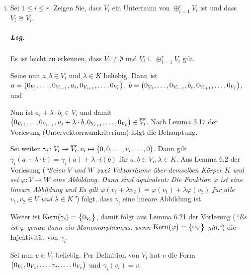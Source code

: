 \documentclass{scrreprt}
\newcommand\Kern{\text{Kern}}
\begin{document}
\begin{enumerate}[(i)]
\item Sei $1 \leq i \leq r$.
  Zeigen Sie, dass $\overline{V_i}$ ein Unterraum von $\oplus_{i = 1}^r V_i$ ist
  und dass $V_i \cong \overline{V_i}$.

  \subparagraph{Lsg.} Es ist leicht zu erkennen, dass
  $\overline{V_i} \ne \emptyset$ und
  $\overline{V_i} \subseteq \oplus_{i = 1}^r V_i$ gilt.

  Seine nun $a, b \in \overline{V_i}$ und $\lambda \in K$ beliebig.
  Dann ist
  $a = \qty\big(
    0_{V_1}, \ldots, 0_{V_{i - 1}}, a_i, 0_{V_{i + 1}}, \ldots, 0_{V_r}
  )$,
  $b = \qty\big(
    0_{V_1}, \ldots, 0_{V_{i - 1}}, b_i, 0_{V_{i + 1}}, \ldots, 0_{V_r}
  )$,
  und
  Nun ist $a_i + \lambda \cdot b_i \in V_i$ und damit
  $\qty\big(
    0_{V_1},
    \ldots,
    0_{V_{i - 1}},
    a_i + \lambda \cdot b,
    0_{V_{i + 1}},
    \ldots,
    0_{V_r}
  ) \in \overline{V_i}$.
  Nach Lemma 3.17 der Vorlesung (Untervektorraumkriterium) folgt die Behauptung.

  Sei weiter
  $\gamma_i \colon V_i \to \overline{V_i},
  v_i \mapsto \qty\big(0, 0, \ldots, v_i, \ldots, 0)$.
  Dann gilt $\gamma_i(a + \lambda \cdot b) = \gamma_i(a) + \lambda \cdot i(b)$
  für $a, b \in V_i, \lambda \in K$.
  Aus Lemma 6.2 der Vorlesung (\emph{``Seien $V$ und $W$ zwei Vektorräume über
    demselben Körper $K$ und sei $\varphi \colon V \to W$ eine Abbildung.
    Dann sind äquivalent: Die Funktion $\varphi$ ist eine lineare Abbildung und
    Es gilt $\varphi(v_1 + \lambda v_2) = \varphi(v_1) + \lambda\varphi(v_2)$
    für alle $v_1, v_2 \in V$ und $\lambda \in K$''})
  folgt, dass $\gamma_i$ eine lineare Abbildung ist.

  Weiter ist $\Kern(\gamma_i) = \qty\big{0_{V_i}}$, damit folgt aus Lemma 6.21 der
  Vorlesung (\emph{``Es ist $\varphi$ genau dann ein Monomorphismus. wenn
    $\Kern\qty\big(\varphi) = \qty\big{0_V}$ gilt.''}) die Injektivität von
  $\gamma_i$.

  Sei nun $v \in \overline{V_i}$ beliebig.
  Per Definition von $\overline{V_i}$ hat $v$ die Form
  $\qty\big(0_{V_1}, 0_{V_2}, \ldots, v_i, \ldots, 0_{V_r})$
  und $\gamma_i(v_i) = v$.


\end{enumerate}
\end{document}
